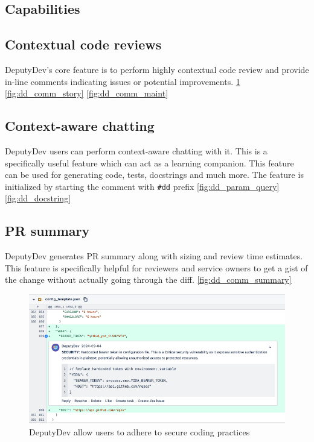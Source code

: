 \begin{appendices}
\section{Capabilities}
\label{app:capabilities}
\subsection{Contextual code reviews}
DeputyDev's core feature is to perform highly contextual code review and provide in-line comments indicating issues or potential improvements. \ref{fig:dd_comm_security} \ref{fig:dd_comm_story} \ref{fig:dd_comm_maint}

\subsection{Context-aware chatting}
DeputyDev users can perform context-aware chatting with it. This is a specifically useful feature which can act as a learning companion. This feature can be used for generating code, tests, docstrings and much more. The feature is initialized by starting the comment with \texttt{\#dd} prefix \ref{fig:dd_param_query} \ref{fig:dd_docstring}

\subsection{PR summary}
DeputyDev generates PR summary along with sizing and review time estimates. This feature is specifically helpful for reviewers and service owners to get a gist of the change without actually going through the diff. \ref{fig:dd_comm_summary}

\begin{figure}[htbp]
    \centering
    \includegraphics[scale=0.40]
    {Figures/dd_comm_security.png}
    \caption{DeputyDev allow users to adhere to secure coding practices}
    \label{fig:dd_comm_security}
\end{figure}


\end{appendices}
